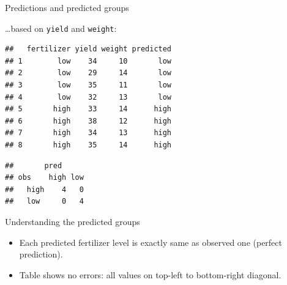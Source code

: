 \documentclass[ignorenonframetext,]{beamer}
\newenvironment{Shaded}{\begin{snugshade}}{\end{snugshade}}
\newcommand{\DataTypeTok}[1]{\textcolor[rgb]{0.13,0.29,0.53}{#1}}
\newcommand{\KeywordTok}[1]{\textcolor[rgb]{0.13,0.29,0.53}{\textbf{#1}}}
\newcommand{\NormalTok}[1]{#1}
\newcommand{\OperatorTok}[1]{\textcolor[rgb]{0.81,0.36,0.00}{\textbf{#1}}}
\begin{document}
\begin{frame}[fragile]{Predictions and predicted groups}
\protect\hypertarget{predictions-and-predicted-groups}{}

\ldots based on \texttt{yield} and \texttt{weight}:

\footnotesize

\begin{Shaded}
\end{Shaded}

\begin{verbatim}
##   fertilizer yield weight predicted
## 1        low    34     10       low
## 2        low    29     14       low
## 3        low    35     11       low
## 4        low    32     13       low
## 5       high    33     14      high
## 6       high    38     12      high
## 7       high    34     13      high
## 8       high    35     14      high
\end{verbatim}

\begin{Shaded}
\end{Shaded}

\begin{verbatim}
##       pred
## obs    high low
##   high    4   0
##   low     0   4
\end{verbatim}

\normalsize

\end{frame}

\begin{frame}{Understanding the predicted groups}
\protect\hypertarget{understanding-the-predicted-groups}{}

\begin{itemize}
\item
  Each predicted fertilizer level is exactly same as observed one
  (perfect prediction).
\item
  Table shows no errors: all values on top-left to bottom-right
  diagonal.
\end{itemize}

\end{frame}
\end{document}
